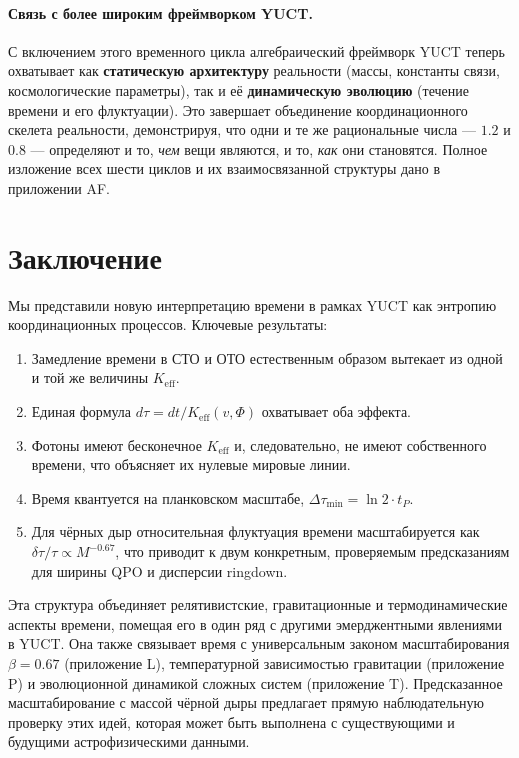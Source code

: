 \documentclass[12pt,a4paper]{article}
\newcommand{\Keff}{K_{\mathrm{eff}}}
\begin{document}
	\paragraph{Связь с более широким фреймворком YUCT.}
	С включением этого временного цикла алгебраический фреймворк YUCT теперь охватывает как \textbf{статическую архитектуру} реальности (массы, константы связи, космологические параметры), так и её \textbf{динамическую эволюцию} (течение времени и его флуктуации). Это завершает объединение координационного скелета реальности, демонстрируя, что одни и те же рациональные числа — \(1.2\) и \(0.8\) — определяют и то, \emph{чем} вещи являются, и то, \emph{как} они становятся. Полное изложение всех шести циклов и их взаимосвязанной структуры дано в приложении AF.
	
	\section{Заключение}
	
	Мы представили новую интерпретацию времени в рамках YUCT как энтропию координационных процессов. Ключевые результаты:
	\begin{enumerate}
		\item Замедление времени в СТО и ОТО естественным образом вытекает из одной и той же величины \(\Keff\).
		\item Единая формула \(d\tau = dt/\Keff(v,\Phi)\) охватывает оба эффекта.
		\item Фотоны имеют бесконечное \(\Keff\) и, следовательно, не имеют собственного времени, что объясняет их нулевые мировые линии.
		\item Время квантуется на планковском масштабе, \(\Delta \tau_{\min} = \ln 2 \cdot t_P\).
		\item Для чёрных дыр относительная флуктуация времени масштабируется как \(\delta\tau/\tau \propto M^{-0.67}\), что приводит к двум конкретным, проверяемым предсказаниям для ширины QPO и дисперсии ringdown.
	\end{enumerate}
	
	Эта структура объединяет релятивистские, гравитационные и термодинамические аспекты времени, помещая его в один ряд с другими эмерджентными явлениями в YUCT. Она также связывает время с универсальным законом масштабирования \(\beta = 0.67\) (приложение L), температурной зависимостью гравитации (приложение P) и эволюционной динамикой сложных систем (приложение T). Предсказанное масштабирование с массой чёрной дыры предлагает прямую наблюдательную проверку этих идей, которая может быть выполнена с существующими и будущими астрофизическими данными.
	
\end{document}

